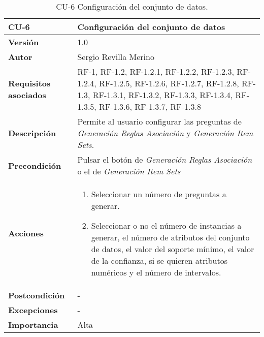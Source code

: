 \begin{table}[h]
	\centering
	\begin{tabularx}{\linewidth}{ p{} p{} }
		\toprule
		\textbf{CU-6}    & \textbf{Configuración del conjunto de datos}\\
		\toprule
		\textbf{Versión}              & 1.0    \\
		\textbf{Autor}                & Sergio Revilla Merino \\
		\textbf{Requisitos asociados} & RF-1, RF-1.2, RF-1.2.1, RF-1.2.2, RF-1.2.3, RF-1.2.4, RF-1.2.5, RF-1.2.6, RF-1.2.7, RF-1.2.8, RF-1.3, RF-1.3.1, RF-1.3.2, RF-1.3.3, RF-1.3.4, RF-1.3.5, RF-1.3.6, RF-1.3.7, RF-1.3.8 \\
		\textbf{Descripción}          & Permite al usuario configurar las preguntas de \textit{Generación Reglas Asociación} y \textit{Generación Item Sets}.  \\
		\textbf{Precondición}         & Pulsar el botón de \textit{Generación Reglas Asociación} o el de \textit{Generación Item Sets} \\
		\textbf{Acciones}             &
		\begin{enumerate}
			\def\labelenumi{\arabic{enumi}.}
			\tightlist
			\item Seleccionar un número de preguntas a generar.
            \item Seleccionar o no el número de instancias a generar, el número de atributos del conjunto de datos, el valor del soporte mínimo, el valor de la confianza, si se quieren atributos numéricos y el número de intervalos.
		\end{enumerate} \\
		\textbf{Postcondición}        & - \\
		\textbf{Excepciones}          & - \\
		\textbf{Importancia}          & Alta \\
		\bottomrule
	\end{tabularx}
	\caption{CU-6 Configuración del conjunto de datos.}
\end{table}

